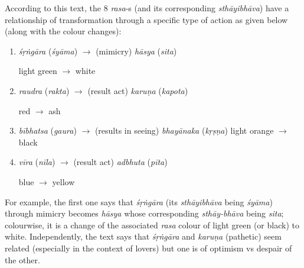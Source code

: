 According to this text, the 8 \textsl{rasa}-s (and its corresponding \textsl{sthāyibhāva}) have a relationship of transformation through a specific type of action as given below (along with the colour changes):
\begin{enumerate}
\item \textsl{śṛṅgāra} (\textsl{śyāma}) $\to$ (mimicry) \textsl{hāsya}
 (\textsl{sita}) 
 
 light green $\to$ white

\item \textsl{raudra} (\textsl{rakta}) $\to$ (result act) \textsl{karuṇa} (\textsl{kapota}) 

red $\to$ ash

\item \textsl{bībhatsa} (\textsl{gaura}) $\to$ (results in seeing) \textsl{bhayānaka} (\textsl{kṛṣṇa}) 
light orange $\to$ black

\item \textsl{vīra} (\textsl{nīla}) $\to$ (result act) \textsl{adbhuta}
 (\textsl{pīta}) 
 
 blue $\to$ yellow 
\end{enumerate}

For example, the first one says that \textsl{śṛṅgāra} (its \textsl{sthāyibhāva} being \textsl{śyāma}) through mimicry becomes \textsl{hāsya} whose corresponding \textsl{sthāy-bhāva} being \textsl{sita}; colourwise, it is a change of the associated \textsl{rasa} colour of light green (or black) to white. Independently, the text says that \textsl{śṛṅgāra} and \textsl{karuṇa} (pathetic) seem related (especially in the context of lovers) but one is of optimism vs despair of the other.

